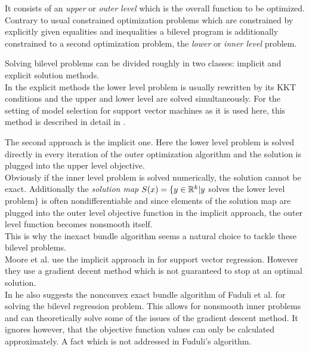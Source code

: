 It consists of an \emph{upper} or \emph{outer level} which is the overall function to be optimized. Contrary to usual constrained optimization problems which are constrained by explicitly given equalities and inequalities a  bilevel program is additionally constrained to a second optimization problem, the \emph{lower} or \emph{inner level} problem.

Solving bilevel problems can be divided roughly in two classes: implicit and explicit solution methods. \\
In the explicit methods the lower level problem is usually rewritten by its KKT conditions and the upper and lower level are solved simultaneously. For the setting of model selection for support vector machines as it is used here, this method is described in detail in \cite{Kunapuli2008}.

The second approach is the implicit one. Here the lower level problem is solved directly in every iteration of the outer optimization algorithm and the solution is plugged into the upper level objective. \\
Obviously if the inner level problem is solved numerically, the solution cannot be exact. Additionally the \emph{solution map} \( S(x) = \{y \in \mathbb{R}^k | y\) solves the lower level problem\(\}\) is often nondifferentiable \cite{Outrata1998} and since elements of  the solution map are plugged into the outer level objective function in the implicit approach, the outer level function becomes nonsmooth itself. \\
This is why the inexact bundle algorithm seems a natural choice to tackle these bilevel problems. \\ 
Moore et al. use the implicit approach in \cite{Moore2011} for support vector regression. However they use a gradient decent method which is not guaranteed to stop at an optimal solution. \\
In \cite{Moore2010a} he also suggests the nonconvex exact bundle algorithm of Fuduli et al. \cite{Fuduli2004a} for solving the bilevel regression problem. This allows for nonsmooth inner problems and can theoretically solve some of the issues of the gradient descent method. It ignores however, that the objective function values can only be calculated approximately. A fact which is not addressed in Fuduli's algorithm.


